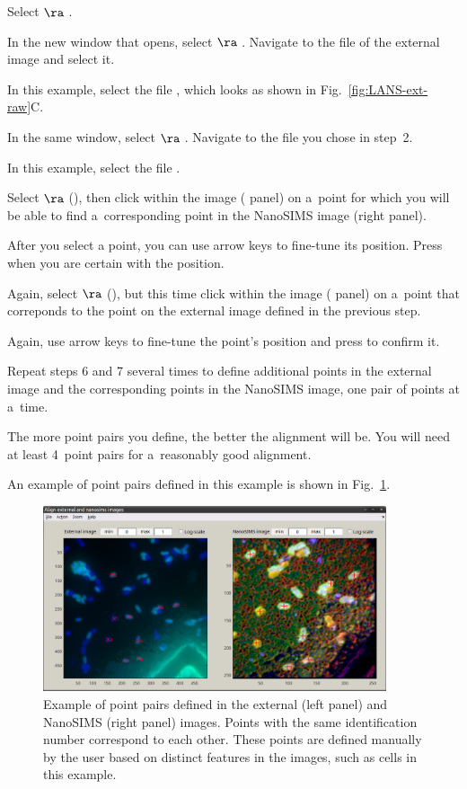 \s Select  $\ra$ .

\s In the new window that opens, select  $\ra$ . Navigate to the file of the external image and select it.

\nb\bul In this example, select the file , which looks as shown in Fig.~\ref{fig:LANS-ext-raw}C.

\s In the same window, select  $\ra$ . Navigate to the file you chose in step~2.

\nb\bul In this example, select the file .

\s Select  $\ra$  (), then click within the  image ( panel) on a~point for which you will be able to find a~corresponding point in the NanoSIMS image (right panel).

\nb\bul After you select a point, you can use arrow keys to fine-tune its position. Press  when you are certain with the position.

\s Again, select  $\ra$  (), but this time click within the  image ( panel) on a~point that correponds to the point on the external image defined in the previous step. 

\nb\bul Again, use arrow keys to fine-tune the point's position and press  to confirm it.

\s Repeat steps 6 and 7 several times to define additional points in the external image and the corresponding points in the NanoSIMS image, one pair of points at a~time.

\nb\bul The more point pairs you define, the better the alignment will be. You will need at least 4~point pairs for a~reasonably good alignment. 

\bul An example of point pairs defined in this example is shown in Fig.~\ref{fig:LANS-ext-window}.

\begin{figure}[!ht]
\centering
\includegraphics[width=0.9\textwidth]{figs7/LANS-ext-align-points}
\caption{\label{fig:LANS-ext-window}%
Example of point pairs defined in the external (left panel) and NanoSIMS (right panel) images. Points with the same identification number correspond to each other. These points are defined manually by the user based on distinct features in the images, such as cells in this example.}
\end{figure}

